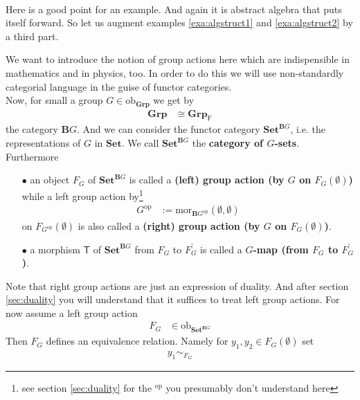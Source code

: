 \\
Here is a good point for an example. And again it is abstract algebra that puts itself forward. So let us augment examples \ref{exa:algstruct1} and \ref{exa:algstruct2} by a third part.
\\
\begin{exa}
\label{exa:algstruct3}
We want to introduce the notion of group actions here which are indispensible in mathematics and in physics, too. In order to do this we will use non-standardly categorial language in the guise of functor categories.
\\
Now, for small a group $G \in \mathrm{ob}_{\mathbf{Grp}}$ we get by
\begin{align*}
  \mathbf{Grp}
  &\cong
  \mathbf{Grp}_{\mathrm{F}}
\end{align*}
the category $\mathbf{B}G$. And we can consider the functor category $\mathbf{Set}^{\mathbf{B}G}$, i.e. the representations of $G$ in $\mathbf{Set}$. We call $\mathbf{Set}^{\mathbf{B}G}$ the \textbf{category of $G$-sets}. Furthermore
\begin{enumerate}
\item[$\bullet$]
an object $F_{G}$ of $\mathbf{Set}^{\mathbf{B}G}$ is called a \textbf{(left) group action (by $G$ on $F_{G}(\emptyset)$)} while a left group action by\footnote{see section \ref{sec:duality} for the {\glqq}$^{\mathrm{op}}${\grqq} you presumably don't understand here}
\begin{align*}
  G^{\textrm{op}}
  &:=
  \mathrm{mor}_{\mathbf{B}G^{\textrm{op}}}
  \left(
    \emptyset,
    \emptyset
  \right)
\end{align*}
on $F_{G^{\textrm{op}}}(\emptyset)$ is also called a \textbf{(right) group action (by $G$ on $F_{G}(\emptyset)$)}.
\item[$\bullet$]
a morphism $\mathsf{T}$ of $\mathbf{Set}^{\mathbf{B}G}$ from $F_{G}$ to $F_{G}^{\backprime}$ is called a \textbf{$G$-map (from $F_{G}$ to $F_{G}^{\backprime}$)}.
\end{enumerate}
Note that right group actions are just an expression of duality. And after section \ref{sec:duality} you will understand that it suffices to treat left group actions. For now assume a left group action
\begin{align*}
  F_{G}
  &\in
  \mathrm{ob}_{\mathbf{Set}^{\mathbf{B}G}}
\end{align*}
Then $F_{G}$ defines an equivalence relation. Namely for $y_{1},y_{2} \in F_{G}(\emptyset)$ set
\begin{align*}
  y_{1}
  \sim_{F_{G}}

\end{align*}
\end{exa}

